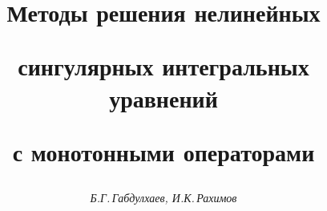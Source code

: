 






\newcommand{\ctg}{\operatorname{ctg}}


\newcommand{\cosec}{\operatorname{cosec}}


\newcommand{\tg}{\operatorname{tg}}


\newcommand{\operator}[3]{#1 : #2 \to #3}


\newcommand{\tts}[1]{}







\setcounter{page}{15}















\author{\it Б.Г.\,Габдулхаев, И.К.\,Рахимов}




\title{Методы решения нелинейных


сингулярных интегральных уравнений


с монотонными операторами}





\date{}




\pagestyle{plain} %







\maketitle


